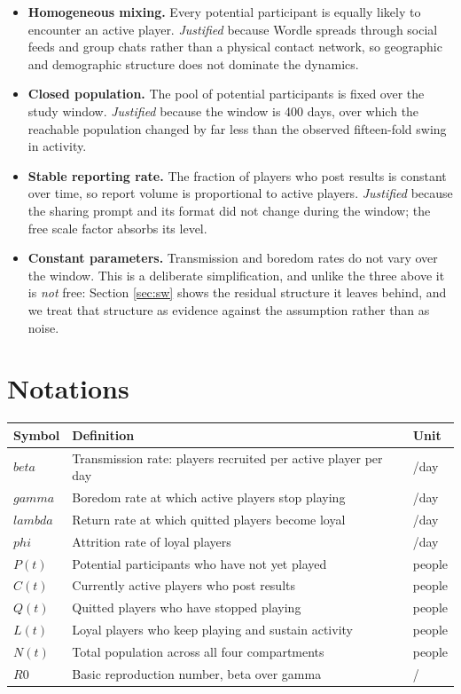 \documentclass[12pt]{article}
\begin{document}
\begin{itemize}
  \item \textbf{Homogeneous mixing.} Every potential participant is equally
  likely to encounter an active player. \emph{Justified} because Wordle spreads
  through social feeds and group chats rather than a physical contact network,
  so geographic and demographic structure does not dominate the dynamics.

  \item \textbf{Closed population.} The pool of potential participants is fixed
  over the study window. \emph{Justified} because the window is 400 days, over
  which the reachable population changed by far less than the observed
  fifteen-fold swing in activity.

  \item \textbf{Stable reporting rate.} The fraction of players who post results
  is constant over time, so report volume is proportional to active players.
  \emph{Justified} because the sharing prompt and its format did not change
  during the window; the free scale factor absorbs its level.

  \item \textbf{Constant parameters.} Transmission and boredom rates do not vary
  over the window. This is a deliberate simplification, and unlike the three
  above it is \emph{not} free: Section \ref{sec:sw} shows the residual structure
  it leaves behind, and we treat that structure as evidence against the
  assumption rather than as noise.
\end{itemize}

\section{Notations}\label{sec:SEC-040}
\begin{longtable}{lll}
\toprule
Symbol & Definition & Unit \\
\midrule
\endhead
$beta$ & Transmission rate: players recruited per active player per day & /day \\
$gamma$ & Boredom rate at which active players stop playing & /day \\
$lambda$ & Return rate at which quitted players become loyal & /day \\
$phi$ & Attrition rate of loyal players & /day \\
$P(t)$ & Potential participants who have not yet played & people \\
$C(t)$ & Currently active players who post results & people \\
$Q(t)$ & Quitted players who have stopped playing & people \\
$L(t)$ & Loyal players who keep playing and sustain activity & people \\
$N(t)$ & Total population across all four compartments & people \\
$R0$ & Basic reproduction number, beta over gamma & / \\
\bottomrule
\end{longtable}
\end{document}
